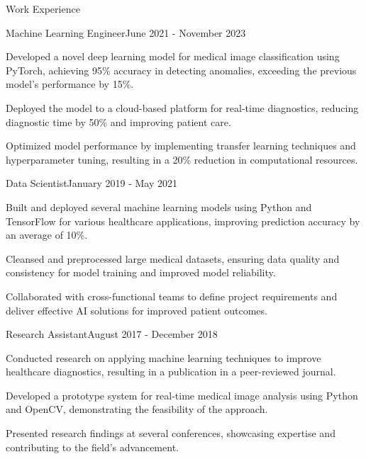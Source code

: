 \documentclass{resume} %
\begin{document}
    \begin{rSection}{Work Experience}
                    \begin{rSubsection}
                {Machine Learning Engineer}{June 2021 - November 2023}
                                    {}
                                {}
                                    \item Developed a novel deep learning model for medical image classification using PyTorch, achieving 95\% accuracy in detecting anomalies, exceeding the previous model's performance by 15\%.
                                    \item Deployed the model to a cloud-based platform for real-time diagnostics, reducing diagnostic time by 50\% and improving patient care.
                                    \item Optimized model performance by implementing transfer learning techniques and hyperparameter tuning, resulting in a 20\% reduction in computational resources.
                            \end{rSubsection}
                    \begin{rSubsection}
                {Data Scientist}{January 2019 - May 2021}
                                    {}
                                {}
                                    \item Built and deployed several machine learning models using Python and TensorFlow for various healthcare applications, improving prediction accuracy by an average of 10\%.
                                    \item Cleansed and preprocessed large medical datasets, ensuring data quality and consistency for model training and improved model reliability.
                                    \item Collaborated with cross-functional teams to define project requirements and deliver effective AI solutions for improved patient outcomes.
                            \end{rSubsection}
                    \begin{rSubsection}
                {Research Assistant}{August 2017 - December 2018}
                                    {}
                                {}
                                    \item Conducted research on applying machine learning techniques to improve healthcare diagnostics, resulting in a publication in a peer-reviewed journal.
                                    \item Developed a prototype system for real-time medical image analysis using Python and OpenCV, demonstrating the feasibility of the approach.
                                    \item Presented research findings at several conferences, showcasing expertise and contributing to the field's advancement.
                            \end{rSubsection}
            \end{rSection}
\end{document}
